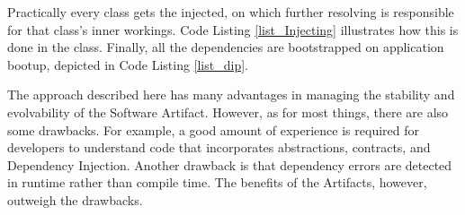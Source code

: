Practically every class gets the 
injected, on which further resolving is responsible for that class's inner workings. Code
Listing \ref{list_Injecting} illustrates how this is done in the
 class. Finally, all the dependencies are
bootstrapped on application bootup, depicted in Code Listing \ref{list_dip}. 

The approach described here has many advantages in managing the stability and evolvability
of the Software Artifact. However, as for most things, there are also some drawbacks. For
example, a good amount of experience is required for developers to understand code that
incorporates abstractions, contracts, and Dependency Injection. Another drawback is that
dependency errors are detected in runtime rather than compile time. The benefits of the
Artifacts, however, outweigh the drawbacks.